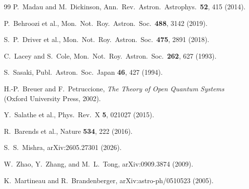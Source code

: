 \documentclass[aps,prd,twocolumn,superscriptaddress]{revtex4-2}
\begin{document}
\begin{thebibliography}{99}
P.~Madau and M.~Dickinson, Ann.\ Rev.\ Astron.\ Astrophys.\ \textbf{52}, 415 (2014).

P.~Behroozi et al., Mon.\ Not.\ Roy.\ Astron.\ Soc.\ \textbf{488}, 3142 (2019).

S.~P.~Driver et al., Mon.\ Not.\ Roy.\ Astron.\ Soc.\ \textbf{475}, 2891 (2018).

C.~Lacey and S.~Cole, Mon.\ Not.\ Roy.\ Astron.\ Soc.\ \textbf{262}, 627 (1993).

S.~Sasaki, Publ.\ Astron.\ Soc.\ Japan \textbf{46}, 427 (1994).

H.-P.~Breuer and F.~Petruccione, \textit{The Theory of Open Quantum Systems} (Oxford University Press, 2002).

Y.~Salathe et al., Phys.\ Rev.\ X \textbf{5}, 021027 (2015).

R.~Barends et al., Nature \textbf{534}, 222 (2016).

S.~S.~Mishra, arXiv:2605.27301 (2026).

W.~Zhao, Y.~Zhang, and M.~L.~Tong, arXiv:0909.3874 (2009).

K.~Martineau and R.~Brandenberger, arXiv:astro-ph/0510523 (2005).

\end{thebibliography}
\end{document}
